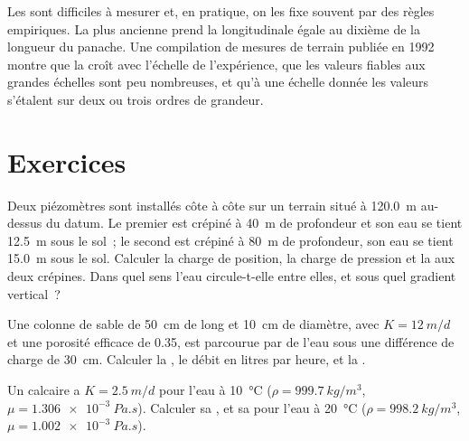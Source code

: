 Les  sont difficiles à mesurer et, en pratique, on les fixe souvent par
des règles empiriques. La plus ancienne prend la  longitudinale égale au dixième de
la longueur du panache. Une compilation de mesures de terrain publiée en
1992 montre que la  croît avec l'échelle de l'expérience,
que les valeurs fiables aux grandes échelles sont peu nombreuses, et qu'à une échelle donnée les
valeurs s'étalent sur deux ou trois ordres de grandeur.

\section{Exercices}

\begin{exercise}[$\star$]\label{exo:b3:hydrogeology:1}
Deux piézomètres sont installés côte à côte sur un terrain situé à \qty{120.0}{m} au-dessus du
datum. Le premier est crépiné à \qty{40}{m} de profondeur et son eau se tient
\qty{12.5}{m} sous le sol~; le second est crépiné à \qty{80}{m}
de profondeur, son eau se tient \qty{15.0}{m} sous le sol. Calculer la charge de
position, la charge de pression et la  aux deux crépines. Dans quel sens
l'eau circule-t-elle entre elles, et sous quel gradient vertical~?
\end{exercise}

\begin{exercise}[$\star$]\label{exo:b3:hydrogeology:2}
Une colonne de sable de \qty{50}{cm} de long et \qty{10}{cm} de diamètre, avec $K =
\qty{12}{m/d}$ et une porosité efficace de 0.35, est parcourue par de l'eau sous une
différence de charge de \qty{30}{cm}. Calculer la , le débit
en litres par heure, et la .
\end{exercise}

\begin{exercise}[$\star$]\label{exo:b3:hydrogeology:3}
Un calcaire a $K = \qty{2.5}{m/d}$ pour l'eau à \qty{10}{\celsius}
($\rho = \qty{999.7}{kg/m^3}$, $\mu = \qty{1.306e-3}{Pa.s}$). Calculer sa
, et sa  pour l'eau à
\qty{20}{\celsius} ($\rho = \qty{998.2}{kg/m^3}$, $\mu =
\qty{1.002e-3}{Pa.s}$).
\end{exercise}

